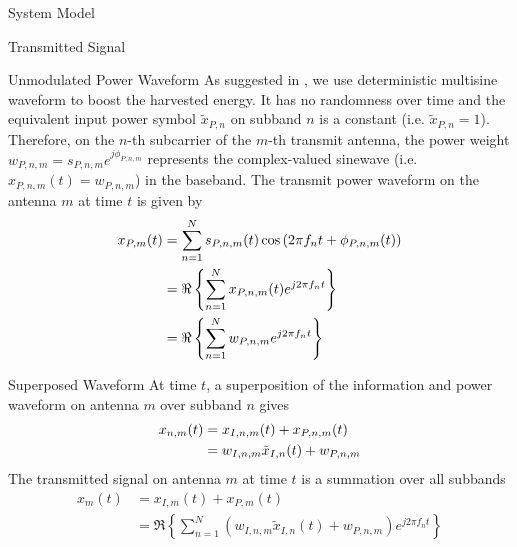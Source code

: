 \documentclass{IEEEtran}
\begin{document}
\begin{section} {System Model}
\begin{subsection} {Transmitted Signal}
            \begin{subsubsection} {Unmodulated Power Waveform}
                As suggested in \cite{Clerckx2018b,Clerckx2016a}, we use deterministic multisine waveform to boost the harvested energy. It has no randomness over time and the equivalent input power symbol $\tilde{x}_{P,n}$ on subband $n$ is a constant (i.e. $\tilde{x}_{P,n} = 1$). Therefore, on the $n$-th subcarrier of the $m$-th transmit antenna, the power weight $w_{P,n,m} = s_{P,n,m} e^{j\phi_{P,n,m}}$ represents the complex-valued sinewave (i.e. $x_{P,n,m}(t) = w_{P,n,m}$) in the baseband. The transmit power waveform on the antenna $m$ at time $t$ is given by
                \begin{equation} \label{eq:x{P,m}(t)}
                    \begin{split}
                        x_{P,m}(t)
                        &= \sum_{n=1}^{N} s_{P,n,m}(t) \cos \left( 2 \pi f_n t + \phi_{P,n,m}(t) \right) \\
                        &= \Re \left\{ \sum_{n=1}^{N} x_{P,n,m}(t) e^{j2 \pi f_n t} \right\} \\
                        &= \Re \left\{ \sum_{n=1}^{N} w_{P,n,m} e^{j2 \pi f_n t} \right\}
                    \end{split}
                \end{equation}
            \end{subsubsection}

            \begin{subsubsection} {Superposed Waveform}
                At time $t$, a superposition of the information and power waveform on antenna $m$ over subband $n$ gives
                \begin{equation} \label{eq:x_{n,m}(t)}
                    \begin{split}
                        x_{n,m}(t)
                        &= x_{I,n,m}(t)+x_{P,n,m}(t) \\
                        &= w_{I,n,m} \tilde{x}_{I,n}(t)+w_{P,n,m}
                    \end{split}
                \end{equation}
                The transmitted signal on antenna $m$ at time $t$ is a summation over all subbands
                \begin{equation} \label{eq:x_m(t)}
                    \begin{split}
                        x_m(t)
                        &= x_{I,m}(t)+x_{P,m}(t) \\
                        &= \Re \left\{ \sum_{n=1}^{N} (w_{I,n,m} \tilde{x}_{I,n}(t)+w_{P,n,m}) e^{j2 \pi f_n t} \right\}
                    \end{split}
                \end{equation}
            \end{subsubsection}


\end{subsection}
\end{section}
\end{document}
